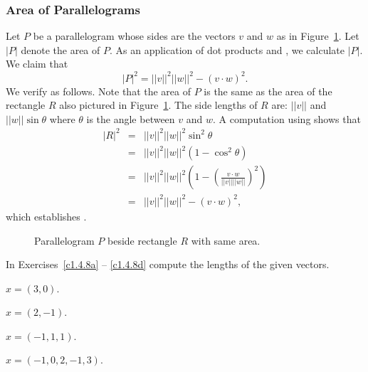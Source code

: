 \documentclass{ximera}
\begin{document}
\subsubsection{Area of Parallelograms}

Let $P$ be a parallelogram whose sides are the vectors $v$ and $w$ as
in Figure~\ref{F:parallel}.  Let $|P|$ denote the area of $P$.  As an
application of dot products  and
, we calculate $|P|$. 
We claim that
\begin{equation}  \label{e:areaP}
|P|^2 = ||v||^2||w||^2 - (v\cdot w)^2.
\end{equation}
We verify  as follows.  Note that the area of $P$
is the same as the area of the rectangle $R$ also pictured in
Figure~\ref{F:parallel}.  The side lengths of $R$ are: $||v||$ and
$||w||\sin\theta$ where $\theta$ is the angle between $v$ and $w$.
A computation using  shows that
\begin{eqnarray*}
|R|^2 & = & ||v||^2 ||w||^2\sin^2\theta \\
& = & ||v||^2 ||w||^2(1-\cos^2\theta) \\
& = & ||v||^2 ||w||^2\left(1-\left(\frac{v\cdot w}{||v|| ||w||}
\right)^2\right)\\
& = & ||v||^2 ||w||^2 - (v\cdot w)^2,
\end{eqnarray*}
which establishes .

\begin{figure}[htb]
     \centerline{%
     }
     \caption{Parallelogram $P$ beside rectangle $R$ with same area.}
     \label{F:parallel}
\end{figure}


\EXER

\TEXER

\noindent In Exercises~\ref{c1.4.8a} -- \ref{c1.4.8d}
compute the lengths of the given vectors.
\begin{exercise} \label{c1.4.8a}
$x=(3,0)$.
\end{exercise}
\begin{exercise} \label{c1.4.8b}
$x=(2,-1)$.
\end{exercise}
\begin{exercise} \label{c1.4.8c}
$x=(-1,1,1)$.
\end{exercise}
\begin{exercise} \label{c1.4.8d}
$x=(-1,0,2,-1,3)$.
\end{exercise}
\end{document}
